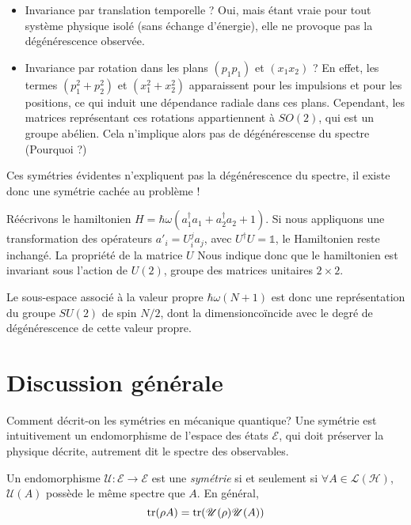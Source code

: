 \documentclass[../notesdecours.tex]{subfiles}
\begin{document}
    \begin{itemize}
        \item Invariance par translation temporelle ? Oui, mais étant vraie pour tout système physique isolé (sans échange d'énergie), elle ne provoque pas la dégénérescence observée.
        \item Invariance par rotation dans les plans $(p_1p_1)$ et $(x_1x_2)$ ? En effet, les termes $(p_1^2 + p_2^2)$ et $(x_1^2 + x_2^2)$ apparaissent pour les impulsions et pour les positions, ce qui induit une dépendance radiale dans ces plans. Cependant, les matrices représentant ces rotations appartiennent à $SO(2)$, qui est un groupe abélien. Cela n'implique alors pas de dégénérescense du spectre (Pourquoi ?)
    \end{itemize}

    Ces symétries évidentes n'expliquent pas la dégénérescence du spectre, il existe donc une symétrie cachée au problème !


    Réécrivons le hamiltonien $H = \hbar\omega(a_1^\dagger a_1 + a_2^\dagger a_2 + 1)$. Si nous appliquons une transformation des opérateurs $a'_i = U_i^j a_j$, avec $U^\dagger U = \mathds{1}$, le Hamiltonien reste inchangé. La propriété de la matrice $U$ Nous indique donc que le hamiltonien est invariant sous l'action de $U(2)$, groupe des matrices unitaires $2\times 2$.

    Le sous-espace associé à la valeur propre $\hbar\omega(N+1)$ est donc une représentation du groupe $SU(2)$ de spin $N/2$, dont la dimension\footnotemark coïncide avec le degré de dégénérescence de cette valeur propre.


    \section{Discussion générale}

    Comment décrit-on les symétries en mécanique quantique? Une symétrie est intuitivement un endomorphisme de l'espace des états $\mathcal{E}$, qui doit préserver la physique décrite, autrement dit le spectre des observables.

    \begin{definition}
    Un endomorphisme $\mathcal{U}:\mathcal{E} \to \mathcal{E}$ est une \emph{symétrie} si et seulement si $\forall A \in \mathcal{L}(\mathcal{H})$, $\mathcal{U}(A)$ possède le même spectre que $A$. En général,
    $$ \tr(\rho A) = \tr(\mathcal{U}(\rho)\mathcal{U}(A)) $$
    \end{definition}
\end{document}
